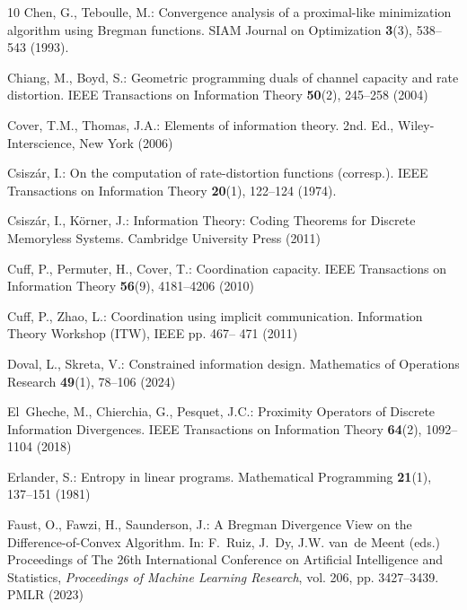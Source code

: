 \documentclass[smallextended,referee,envcountsect,]{svjour3}
\begin{document}
\begin{thebibliography}{10}
Chen, G., Teboulle, M.: Convergence analysis of a proximal-like minimization
  algorithm using {B}regman functions.
\newblock SIAM Journal on Optimization \textbf{3}(3), 538--543 (1993).
\newblock {}

Chiang, M., Boyd, S.: {Geometric programming duals of channel capacity and rate
  distortion}.
\newblock IEEE Transactions on Information Theory \textbf{50}(2), 245--258
  (2004)

Cover, T.M., Thomas, J.A.: Elements of information theory.
\newblock 2nd. Ed., Wiley-Interscience, New York (2006)

Csisz\'{a}r, I.: On the computation of rate-distortion functions (corresp.).
\newblock IEEE Transactions on Information Theory \textbf{20}(1), 122--124
  (1974).
\newblock {}

Csisz\'{a}r, I., K\"{o}rner, J.: Information Theory: Coding Theorems for
  Discrete Memoryless Systems.
\newblock Cambridge University Press (2011)

Cuff, P., Permuter, H., Cover, T.: Coordination capacity.
\newblock IEEE Transactions on Information Theory \textbf{56}(9), 4181--4206
  (2010)

Cuff, P., Zhao, L.: Coordination using implicit communication.
\newblock Information Theory Workshop (ITW), IEEE pp. 467-- 471 (2011)

Doval, L., Skreta, V.: Constrained information design.
\newblock Mathematics of Operations Research \textbf{49}(1), 78--106 (2024)

El~Gheche, M., Chierchia, G., Pesquet, J.C.: {Proximity Operators of Discrete
  Information Divergences}.
\newblock IEEE Transactions on Information Theory \textbf{64}(2), 1092--1104
  (2018)

Erlander, S.: {Entropy in linear programs}.
\newblock Mathematical Programming \textbf{21}(1), 137--151 (1981)

Faust, O., Fawzi, H., Saunderson, J.: {A {B}regman Divergence View on the
  Difference-of-Convex Algorithm}.
\newblock In: F.~Ruiz, J.~Dy, J.W. van~de Meent (eds.) Proceedings of The 26th
  International Conference on Artificial Intelligence and Statistics,
  \emph{Proceedings of Machine Learning Research}, vol. 206, pp. 3427--3439.
  PMLR (2023)


\end{thebibliography}
\end{document}
